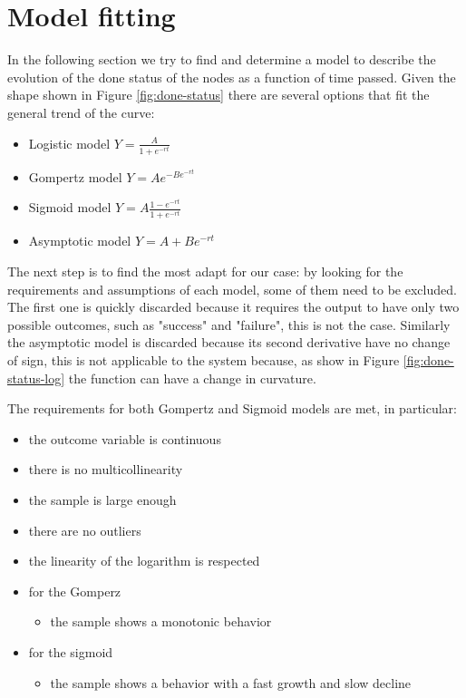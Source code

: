 \section{Model fitting} \label{sec:ModelFitting}
In the following section we try to find and determine a model to describe the evolution of the done status of the nodes as a function of time passed. Given the shape shown in Figure \ref{fig:done-status} there are several options that fit the general trend of the curve:

\begin{itemize}
	\item Logistic model $ Y = \frac{A}{1 + e^{-rt}} $
	\item Gompertz model $ Y = Ae^{-Be^{-rt}} $
	\item Sigmoid model $ Y = A\frac{1-e^{-rt}}{1+e^{-rt}}$
	\item Asymptotic model $ Y = A + Be^{-rt}$
\end{itemize} 

The next step is to find the most adapt for our case: by looking for the requirements and assumptions of each model, some of them need to be excluded. The first one is quickly discarded because it requires the output to have only two possible outcomes, such as "success" and "failure", this is not the case.
Similarly the asymptotic model is discarded because its second derivative have no change of sign, this is not applicable to the system because, as show in Figure \ref{fig:done-status-log} the function can have a change in curvature.


The requirements for both Gompertz and Sigmoid models are met, in particular:
\begin{itemize}
	\item the outcome variable is continuous
	\item there is no multicollinearity
	\item the sample is large enough
	\item there are no outliers
	\item the linearity of the logarithm is respected
	
	\item for the Gomperz
		\begin{itemize}
			\item the sample shows a monotonic behavior
		\end{itemize}
		\item for the sigmoid
		\begin{itemize}
			\item the sample shows a behavior with a fast growth and slow decline
		\end{itemize}
\end{itemize}



